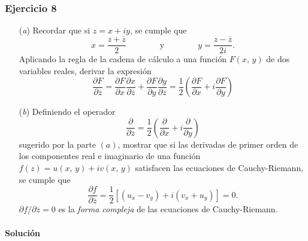 \documentclass[a4paper]{report}
\begin{document}
\subsubsection{Ejercicio 8}

\begin{enumerate}
 \item[(\textit{a})] Recordar que si \(z=x+iy\), se cumple que 
 \[
  x=\frac{z+\overline{z}}{2}
  \qquad\qquad\textrm{y}\qquad\qquad
  y=\frac{z-\overline{z}}{2i}.
 \]
 Aplicando la regla de la cadena de cálculo a una función \(F(x,\,y)\) de dos variables reales, derivar la expresión
 \[
  \frac{\partial F}{\partial\overline{z}}=
  \frac{\partial F}{\partial x}\frac{\partial x}{\partial\overline{z}}+\frac{\partial F}{\partial y}\frac{\partial y}{\partial\overline{z}}=
  \frac{1}{2}\left(\frac{\partial F}{\partial x}+i\frac{\partial F}{\partial y}\right)
 \]
 \item[(\textit{b})] Definiendo el operador
 \[
  \frac{\partial}{\partial\overline{z}}=
  \frac{1}{2}\left(\frac{\partial}{\partial x}+i\frac{\partial}{\partial y}\right)
 \]
 sugerido por la parte \((a)\), mostrar que si las derivadas de primer orden de los componentes real e imaginario de una función \(f(z)=u(x,\,y)+iv(x,\,y)\) satisfacen las ecuaciones de Cauchy-Riemann, se cumple que 
 \[
  \frac{\partial f}{\partial\overline{z}}=\frac{1}{2}[(u_x-v_y)+i(v_x+u_y)]=0.
 \]
 \(\partial f/\partial\overline{z}=0\) es la \emph{forma compleja} de las ecuaciones de Cauchy-Riemann.
\end{enumerate}

\paragraph{Solución}
\end{document}
